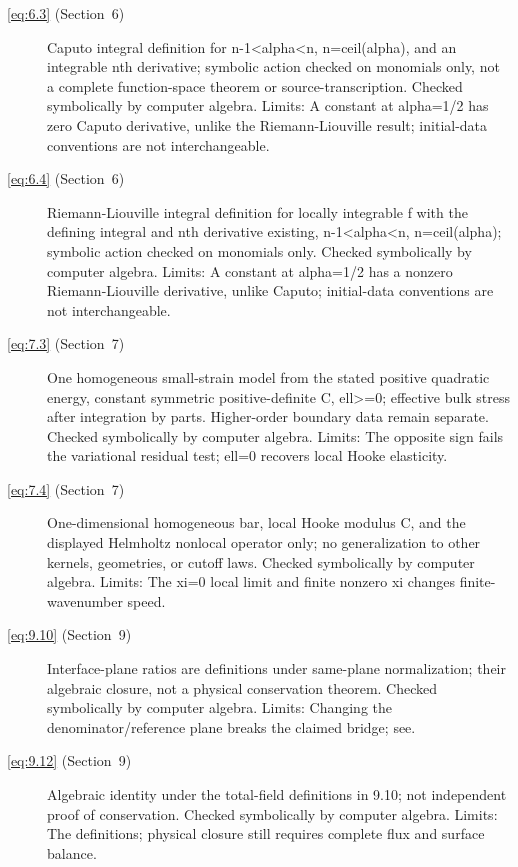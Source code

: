 \begin{description}
  \item[\eqref{eq:6.3} (Section~6)] Caputo integral definition for n-1<alpha<n, n=ceil(alpha), and an integrable nth derivative; symbolic action checked on monomials only, not a complete function-space theorem or source-transcription. Checked symbolically by computer algebra. Limits: A constant at alpha=1/2 has zero Caputo derivative, unlike the Riemann-Liouville result; initial-data conventions are not interchangeable.

  \item[\eqref{eq:6.4} (Section~6)] Riemann-Liouville integral definition for locally integrable f with the defining integral and nth derivative existing, n-1<alpha<n, n=ceil(alpha); symbolic action checked on monomials only. Checked symbolically by computer algebra. Limits: A constant at alpha=1/2 has a nonzero Riemann-Liouville derivative, unlike Caputo; initial-data conventions are not interchangeable.

  \item[\eqref{eq:7.3} (Section~7)] One homogeneous small-strain model from the stated positive quadratic energy, constant symmetric positive-definite C, ell>=0; effective bulk stress after integration by parts. Higher-order boundary data remain separate. Checked symbolically by computer algebra. Limits: The opposite sign fails the variational residual test; ell=0 recovers local Hooke elasticity.

  \item[\eqref{eq:7.4} (Section~7)] One-dimensional homogeneous bar, local Hooke modulus C, and the displayed Helmholtz nonlocal operator only; no generalization to other kernels, geometries, or cutoff laws. Checked symbolically by computer algebra. Limits: The xi=0 local limit and finite nonzero xi changes finite-wavenumber speed.

  \item[\eqref{eq:9.10} (Section~9)] Interface-plane ratios are definitions under same-plane normalization; their algebraic closure, not a physical conservation theorem. Checked symbolically by computer algebra. Limits: Changing the denominator/reference plane breaks the claimed bridge; see.

  \item[\eqref{eq:9.12} (Section~9)] Algebraic identity under the total-field definitions in 9.10; not independent proof of conservation. Checked symbolically by computer algebra. Limits: The definitions; physical closure still requires complete flux and surface balance.


\end{description}
